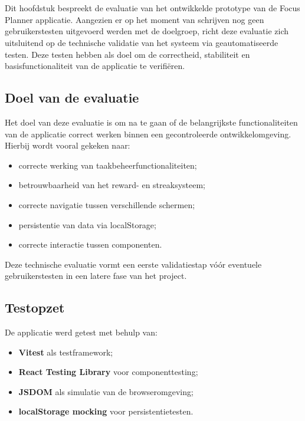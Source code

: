 \chapter{}
\label{ch:evaluatie}

Dit hoofdstuk bespreekt de evaluatie van het ontwikkelde prototype van de Focus Planner applicatie. Aangezien er op het moment van schrijven nog geen gebruikerstesten uitgevoerd werden met de doelgroep, richt deze evaluatie zich uitsluitend op de technische validatie van het systeem via geautomatiseerde testen. Deze testen hebben als doel om de correctheid, stabiliteit en basisfunctionaliteit van de applicatie te verifiëren.

\section{Doel van de evaluatie}

Het doel van deze evaluatie is om na te gaan of de belangrijkste functionaliteiten van de applicatie correct werken binnen een gecontroleerde ontwikkelomgeving. Hierbij wordt vooral gekeken naar:

\begin{itemize}
    \item correcte werking van taakbeheerfunctionaliteiten;
    \item betrouwbaarheid van het reward- en streaksysteem;
    \item correcte navigatie tussen verschillende schermen;
    \item persistentie van data via localStorage;
    \item correcte interactie tussen componenten.
\end{itemize}

Deze technische evaluatie vormt een eerste validatiestap vóór eventuele gebruikerstesten in een latere fase van het project.

\section{Testopzet}

De applicatie werd getest met behulp van:

\begin{itemize}
    \item \textbf{Vitest} als testframework;
    \item \textbf{React Testing Library} voor componenttesting;
    \item \textbf{JSDOM} als simulatie van de browseromgeving;
    \item \textbf{localStorage mocking} voor persistentietesten.
\end{itemize}

